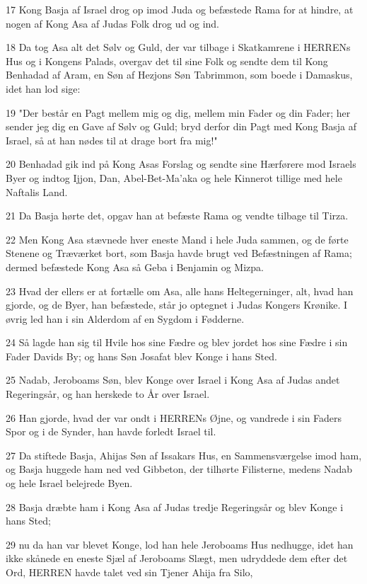 \par 17 Kong Basja af Israel drog op imod Juda og befæstede Rama for at hindre, at nogen af Kong Asa af Judas Folk drog ud og ind.
\par 18 Da tog Asa alt det Sølv og Guld, der var tilbage i Skatkamrene i HERRENs Hus og i Kongens Palads, overgav det til sine Folk og sendte dem til Kong Benhadad af Aram, en Søn af Hezjons Søn Tabrimmon, som boede i Damaskus, idet han lod sige:
\par 19 "Der består en Pagt mellem mig og dig, mellem min Fader og din Fader; her sender jeg dig en Gave af Sølv og Guld; bryd derfor din Pagt med Kong Basja af Israel, så at han nødes til at drage bort fra mig!"
\par 20 Benhadad gik ind på Kong Asas Forslag og sendte sine Hærførere mod Israels Byer og indtog Ijjon, Dan, Abel-Bet-Ma'aka og hele Kinnerot tillige med hele Naftalis Land.
\par 21 Da Basja hørte det, opgav han at befæste Rama og vendte tilbage til Tirza.
\par 22 Men Kong Asa stævnede hver eneste Mand i hele Juda sammen, og de førte Stenene og Træværket bort, som Basja havde brugt ved Befæstningen af Rama; dermed befæstede Kong Asa så Geba i Benjamin og Mizpa.
\par 23 Hvad der ellers er at fortælle om Asa, alle hans Heltegerninger, alt, hvad han gjorde, og de Byer, han befæstede, står jo optegnet i Judas Kongers Krønike. I øvrig led han i sin Alderdom af en Sygdom i Fødderne.
\par 24 Så lagde han sig til Hvile hos sine Fædre og blev jordet hos sine Fædre i sin Fader Davids By; og hans Søn Josafat blev Konge i hans Sted.
\par 25 Nadab, Jeroboams Søn, blev Konge over Israel i Kong Asa af Judas andet Regeringsår, og han herskede to År over Israel.
\par 26 Han gjorde, hvad der var ondt i HERRENs Øjne, og vandrede i sin Faders Spor og i de Synder, han havde forledt Israel til.
\par 27 Da stiftede Basja, Ahijas Søn af Issakars Hus, en Sammensværgelse imod ham, og Basja huggede ham ned ved Gibbeton, der tilhørte Filisterne, medens Nadab og hele Israel belejrede Byen.
\par 28 Basja dræbte ham i Kong Asa af Judas tredje Regeringsår og blev Konge i hans Sted;
\par 29 nu da han var blevet Konge, lod han hele Jeroboams Hus nedhugge, idet han ikke skånede en eneste Sjæl af Jeroboams Slægt, men udryddede dem efter det Ord, HERREN havde talet ved sin Tjener Ahija fra Silo,
